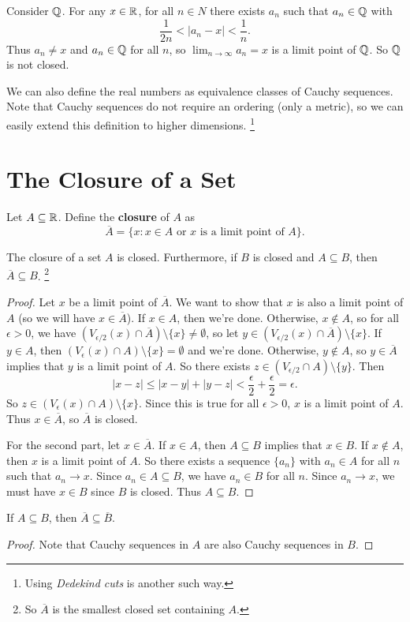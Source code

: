 \begin{example}
  Consider $\mathbb{Q}$. For any $x \in \mathbb{R}$, for all $n \in N$
  there exists $a_n$ such that $a_n \in \mathbb{Q}$ with
  \[
  \frac{1}{2n} < |a_n - x| < \frac{1}{n}
  .\]
  Thus $a_n \ne x$ and $a_n \in \mathbb{Q}$ for all $n$, so
  $\lim_{n \to \infty} a_n = x$ is a limit point of
  $\mathbb{Q}$. So $\mathbb{Q}$ is not closed.
\end{example}

\begin{remark}
  We can also define the real numbers as equivalence
  classes of Cauchy sequences. Note that Cauchy sequences
  do not require an ordering (only a metric), so we can
  easily extend this definition to higher dimensions.
  \footnote{Using \textit{Dedekind cuts} is another such way.}
\end{remark}

\section{The Closure of a Set}

\begin{definition}
  Let $A \subseteq \mathbb{R}$. Define the \textbf{closure}
  of $A$ as
  \[
    \overline{A} = \{x : x \in A \text{ or $x$ is a limit point of $A$}\}
  .\]
\end{definition}

\begin{theorem}
  The closure of a set $A$ is closed. Furthermore,
  if $B$ is closed and $A \subseteq B$, then
  $\overline{A} \subseteq B$.
  \footnote{So $\overline{A}$ is the smallest closed set
    containing $A$.}
\end{theorem}

\begin{proof}
  Let $x$ be a limit point of $\overline{A}$.
  We want to show that $x$ is also a limit point of $A$
  (so we will have $x \in \overline{A}$). If $x \in A$,
  then we're done. Otherwise, $x \notin A$, so for
  all $\epsilon > 0$, we have
  $(V_{\epsilon / 2}(x) \cap \overline{A}) \setminus \{x\} \ne \emptyset$,
  so let $y \in (V_{\epsilon / 2}(x) \cap \overline{A}) \setminus \{x\}$.
  If $y \in A$, then $(V_{\epsilon}(x) \cap A) \setminus \{x\}
  = \emptyset$ and we're done. Otherwise, $y \notin A$,
  so $y \in \overline{A}$ implies that $y$ is a limit
  point of $A$. So there exists
  $z \in (V_{\epsilon / 2} \cap A) \setminus \{y\}$.
  Then
  \[|x - z| \le |x - y| + |y - z| < \frac{\epsilon}{2} + \frac{\epsilon}{2} = \epsilon.\]
  So $z \in (V_\epsilon(x) \cap A) \setminus \{x\}$.
  Since this is true for all $\epsilon > 0$,
  $x$ is a limit point of $A$.
  Thus $x \in \overline{A}$, so $\overline{A}$ is closed.

  For the second part, let $x \in \overline{A}$. If
  $x \in A$, then $A \subseteq B$ implies that $x \in B$.
  If $x \notin A$, then $x$ is a limit point of $A$.
  So there exists a sequence $\{a_n\}$ with $a_n \in A$
  for all $n$ such that $a_n \to x$.
  Since $a_n \in A \subseteq B$, we have $a_n \in B$ for
  all $n$. Since $a_n \to x$, we must have
  $x \in B$ since $B$ is closed. Thus
  $A \subseteq B$.
\end{proof}

\begin{corollary}
  If $A \subseteq B$, then $\overline{A} \subseteq \overline{B}$.
\end{corollary}

\begin{proof}
  Note that
  Cauchy sequences in $A$ are also Cauchy sequences in $B$.
\end{proof}

